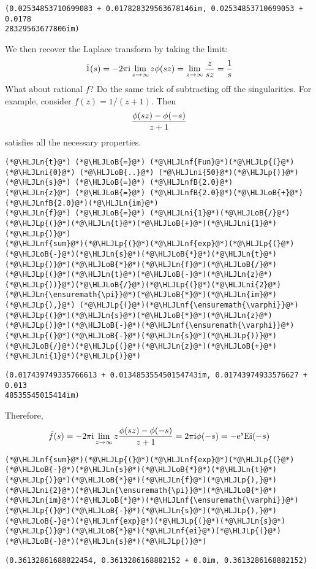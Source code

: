 \documentclass[12pt,landscape]{article}
\newcommand{\HLJLn}[1]{#1}
\newcommand{\HLJLnf}[1]{\textcolor[RGB]{66,102,213}{#1}}
\newcommand{\HLJLnfB}[1]{\textcolor[RGB]{59,151,46}{#1}}
\newcommand{\HLJLni}[1]{\textcolor[RGB]{59,151,46}{#1}}
\newcommand{\HLJLoB}[1]{\textcolor[RGB]{102,102,102}{\textbf{#1}}}
\newcommand{\HLJLp}[1]{#1}
\def\I{ {\rm i} }
\def\E{ {\rm e} }
\begin{document}
{\begin{lstlisting}
(0.02534853710699083 + 0.017828329563678146im, 0.02534853710699053 + 0.0178
28329563677806im)
\end{lstlisting}

\newpage
We then recover the Laplace transform by taking the limit:
\[
\check 1(s) = -2 \pi \I  \lim_{z\rightarrow \infty} z \phi(s z) =
\lim_{z\rightarrow \infty} {z \over s z} = {1 \over s}
\]
What about rational $f$? Do the same trick of subtracting off the singularities. For example, consider $f(z) = 1/(z+1)$. Then
\[
{\phi(s z) - \phi(-s) \over z+1}
\]
satisfies all the necessary properties.
\begin{lstlisting}
(*@\HLJLn{t}@*) (*@\HLJLoB{=}@*) (*@\HLJLnf{Fun}@*)(*@\HLJLp{(}@*)(*@\HLJLni{0}@*) (*@\HLJLoB{..}@*) (*@\HLJLni{50}@*)(*@\HLJLp{)}@*)
(*@\HLJLn{s}@*) (*@\HLJLoB{=}@*) (*@\HLJLnfB{2.0}@*)
(*@\HLJLn{z}@*) (*@\HLJLoB{=}@*) (*@\HLJLnfB{2.0}@*)(*@\HLJLoB{+}@*)(*@\HLJLnfB{2.0}@*)(*@\HLJLn{im}@*)
(*@\HLJLn{f}@*) (*@\HLJLoB{=}@*) (*@\HLJLni{1}@*)(*@\HLJLoB{/}@*)(*@\HLJLp{(}@*)(*@\HLJLn{t}@*)(*@\HLJLoB{+}@*)(*@\HLJLni{1}@*)(*@\HLJLp{)}@*)
(*@\HLJLnf{sum}@*)(*@\HLJLp{(}@*)(*@\HLJLnf{exp}@*)(*@\HLJLp{(}@*)(*@\HLJLoB{-}@*)(*@\HLJLn{s}@*)(*@\HLJLoB{*}@*)(*@\HLJLn{t}@*)(*@\HLJLp{)}@*)(*@\HLJLoB{*}@*)(*@\HLJLn{f}@*)(*@\HLJLoB{/}@*)(*@\HLJLp{(}@*)(*@\HLJLn{t}@*)(*@\HLJLoB{-}@*)(*@\HLJLn{z}@*)(*@\HLJLp{))}@*)(*@\HLJLoB{/}@*)(*@\HLJLp{(}@*)(*@\HLJLni{2}@*)(*@\HLJLn{\ensuremath{\pi}}@*)(*@\HLJLoB{*}@*)(*@\HLJLn{im}@*)(*@\HLJLp{),}@*) (*@\HLJLp{(}@*)(*@\HLJLnf{\ensuremath{\varphi}}@*)(*@\HLJLp{(}@*)(*@\HLJLn{s}@*)(*@\HLJLoB{*}@*)(*@\HLJLn{z}@*)(*@\HLJLp{)}@*)(*@\HLJLoB{-}@*)(*@\HLJLnf{\ensuremath{\varphi}}@*)(*@\HLJLp{(}@*)(*@\HLJLoB{-}@*)(*@\HLJLn{s}@*)(*@\HLJLp{))}@*)(*@\HLJLoB{/}@*)(*@\HLJLp{(}@*)(*@\HLJLn{z}@*)(*@\HLJLoB{+}@*)(*@\HLJLni{1}@*)(*@\HLJLp{)}@*)
\end{lstlisting}

\begin{lstlisting}
(0.017439749335766613 + 0.013485355450154743im, 0.01743974933576627 + 0.013
48535545015414im)
\end{lstlisting}


Therefore,
\[
\check f(s) = -2 \pi \I  \lim_{z\rightarrow \infty} z {\phi(s z) - \phi(-s) \over z+1}  =
2 \pi \I \phi(-s) = -\E^{s} {\rm Ei}(-s)
\]
\begin{lstlisting}
(*@\HLJLnf{sum}@*)(*@\HLJLp{(}@*)(*@\HLJLnf{exp}@*)(*@\HLJLp{(}@*)(*@\HLJLoB{-}@*)(*@\HLJLn{s}@*)(*@\HLJLoB{*}@*)(*@\HLJLn{t}@*)(*@\HLJLp{)}@*)(*@\HLJLoB{*}@*)(*@\HLJLn{f}@*)(*@\HLJLp{),}@*) (*@\HLJLni{2}@*)(*@\HLJLn{\ensuremath{\pi}}@*)(*@\HLJLoB{*}@*)(*@\HLJLn{im}@*)(*@\HLJLoB{*}@*)(*@\HLJLnf{\ensuremath{\varphi}}@*)(*@\HLJLp{(}@*)(*@\HLJLoB{-}@*)(*@\HLJLn{s}@*)(*@\HLJLp{),}@*) (*@\HLJLoB{-}@*)(*@\HLJLnf{exp}@*)(*@\HLJLp{(}@*)(*@\HLJLn{s}@*)(*@\HLJLp{)}@*)(*@\HLJLoB{*}@*)(*@\HLJLnf{ei}@*)(*@\HLJLp{(}@*)(*@\HLJLoB{-}@*)(*@\HLJLn{s}@*)(*@\HLJLp{)}@*)
\end{lstlisting}

\begin{lstlisting}
(0.36132861688822454, 0.3613286168882152 + 0.0im, 0.3613286168882152)
\end{lstlisting}


}
\end{document}
